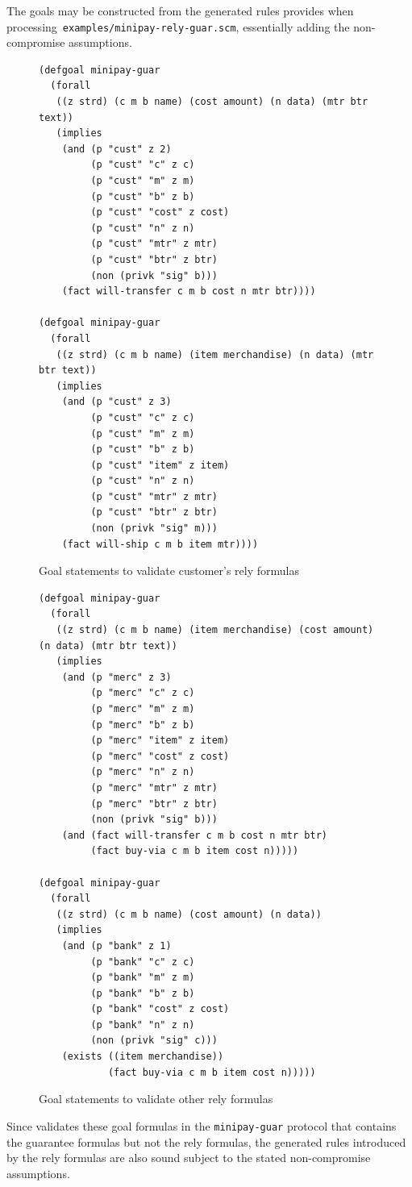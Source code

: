 The goals may be constructed from the generated rules {\cpsa} provides
when processing~\texttt{examples/minipay-rely-guar.scm}, essentially
adding the non-compromise assumptions.
%
\begin{figure}\small
\begin{verbatim}(defgoal minipay-guar
  (forall
   ((z strd) (c m b name) (cost amount) (n data) (mtr btr text))
   (implies
    (and (p "cust" z 2)
         (p "cust" "c" z c)
         (p "cust" "m" z m)
         (p "cust" "b" z b)
         (p "cust" "cost" z cost)
         (p "cust" "n" z n)
         (p "cust" "mtr" z mtr)
         (p "cust" "btr" z btr)
         (non (privk "sig" b)))
    (fact will-transfer c m b cost n mtr btr))))

(defgoal minipay-guar
  (forall
   ((z strd) (c m b name) (item merchandise) (n data) (mtr btr text))
   (implies
    (and (p "cust" z 3)
         (p "cust" "c" z c)
         (p "cust" "m" z m)
         (p "cust" "b" z b)
         (p "cust" "item" z item)
         (p "cust" "n" z n)
         (p "cust" "mtr" z mtr)
         (p "cust" "btr" z btr)
         (non (privk "sig" m)))
    (fact will-ship c m b item mtr))))
\end{verbatim}
  \caption[Goal statements, 1]{Goal statements to validate customer's rely formulas}
  \label{fig:rely:goals:cust}
\end{figure}

\begin{figure}\small
\begin{verbatim}(defgoal minipay-guar
  (forall
   ((z strd) (c m b name) (item merchandise) (cost amount) (n data) (mtr btr text))
   (implies
    (and (p "merc" z 3)
         (p "merc" "c" z c)
         (p "merc" "m" z m)
         (p "merc" "b" z b)
         (p "merc" "item" z item)
         (p "merc" "cost" z cost)
         (p "merc" "n" z n)
         (p "merc" "mtr" z mtr)
         (p "merc" "btr" z btr)
         (non (privk "sig" b)))
    (and (fact will-transfer c m b cost n mtr btr)
         (fact buy-via c m b item cost n)))))

(defgoal minipay-guar
  (forall
   ((z strd) (c m b name) (cost amount) (n data))
   (implies
    (and (p "bank" z 1)
         (p "bank" "c" z c)
         (p "bank" "m" z m)
         (p "bank" "b" z b)
         (p "bank" "cost" z cost)
         (p "bank" "n" z n)
         (non (privk "sig" c)))
    (exists ((item merchandise))
            (fact buy-via c m b item cost n))))) \end{verbatim}
  \caption[Goal statements]{Goal statements to validate other rely formulas}
  \label{fig:rely:goals:others}
\end{figure}
%
Since {\cpsa} validates these goal formulas in the
\texttt{minipay-guar} protocol that contains the guarantee formulas
but not the rely formulas, the generated rules introduced by the rely
formulas are also sound subject to the stated non-compromise
assumptions.


